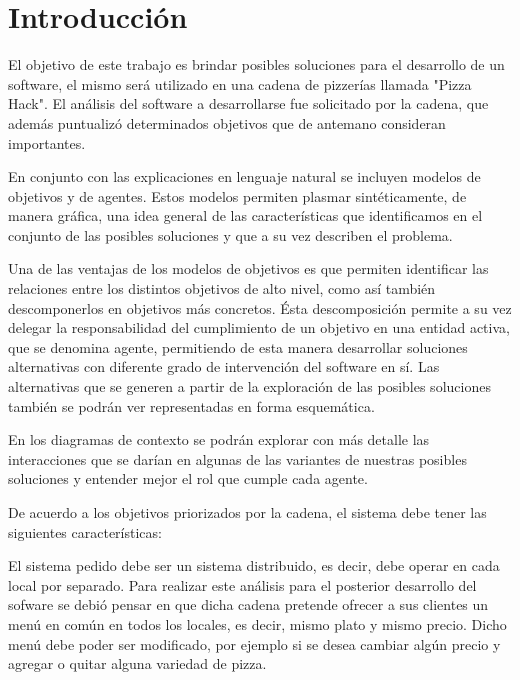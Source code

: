 \documentclass[a4paper,10pt]{article}
\begin{document}
\tableofcontents

\newpage


\section*{Introducci\'on}

El objetivo de este trabajo es brindar posibles soluciones para el desarrollo de un software, el mismo ser\'a utilizado en una cadena de pizzer\'ias llamada "Pizza Hack". El análisis del software a desarrollarse fue solicitado por la cadena, que además puntualizó determinados objetivos que de antemano consideran importantes.


En conjunto con las explicaciones en lenguaje natural se incluyen modelos de objetivos y de agentes. Estos modelos permiten plasmar sintéticamente, de manera gráfica, una idea general de las características que identificamos en el conjunto de las posibles soluciones y que a su vez describen el problema. 

Una de las ventajas de los modelos de objetivos es que permiten identificar las relaciones entre los distintos objetivos de alto nivel, como así también descomponerlos en objetivos más concretos. Ésta descomposición permite a su vez delegar la responsabilidad del cumplimiento de un objetivo en una entidad activa, que se denomina agente, permitiendo de esta manera desarrollar soluciones alternativas con diferente grado de intervención del software en sí. Las alternativas que se generen a partir de la exploración de las posibles soluciones también se podrán ver representadas en forma esquemática. 

En los diagramas de contexto se podrán explorar con más detalle las interacciones que se darían en algunas de las variantes de nuestras posibles soluciones y entender mejor el rol que cumple cada agente.

De acuerdo a los objetivos priorizados por la cadena, el sistema debe tener las siguientes características:


El sistema pedido debe ser un sistema distribuido, es decir, debe operar en cada local por separado. Para realizar este an\'alisis para el posterior desarrollo del sofware se debi\'o pensar en que dicha cadena pretende ofrecer a sus clientes un men\'u en com\'un en todos los locales, es decir, mismo plato y mismo precio. Dicho men\'u debe poder ser modificado, por ejemplo si se desea cambiar alg\'un precio y agregar o quitar alguna variedad de pizza.
\end{document}

